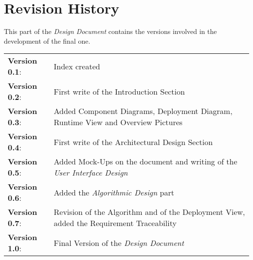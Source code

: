 \section{Revision History}

This part of the \emph{Design Document} contains the versions involved in the development of the final one.

\vspace{10pt}

\renewcommand{\arraystretch}{1.2}

\begin{tabular}{p{3cm} p{10cm}}

	\textbf{Version 0.1}:   & Index created \\
	\textbf{Version 0.2}:   & First write of the Introduction Section \\
	\textbf{Version 0.3}:   & Added Component Diagrams, Deployment Diagram, Runtime View and Overview Pictures\\
	\textbf{Version 0.4}:   & First write of the Architectural Design Section \\
	\textbf{Version 0.5}:   & Added Mock-Ups on the document and writing of the \emph{User Interface Design} \\
	\textbf{Version 0.6}:   & Added the \emph{Algorithmic Design} part \\
	\textbf{Version 0.7}:   & Revision of the Algorithm and of the Deployment View, added the Requirement                                         Traceability\\
	\large{\textbf{Version 1.0}}: & \large{Final Version of the \emph{Design Document}} \\
\end{tabular}